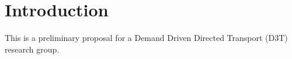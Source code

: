 \section{Introduction}
This is a preliminary proposal for a Demand Driven Directed Transport (D3T) research group. 